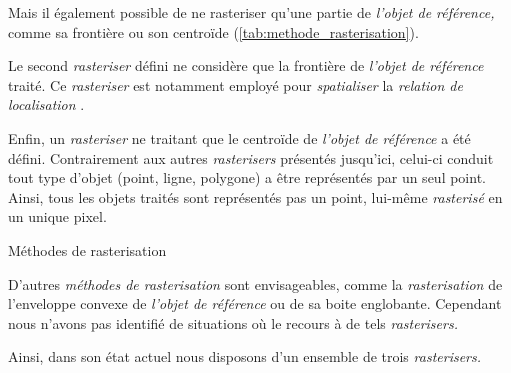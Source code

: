 Mais il également possible de ne rasteriser qu'une partie de \emph{l'objet de référence,} comme sa frontière ou son centroïde (\autoref{tab:methode_rasterisation}).

Le second \emph{rasteriser} défini ne considère que la frontière de \emph{l'objet de référence} traité.
%
Ce \emph{rasteriser} est notamment employé pour \emph{spatialiser} la \emph{relation de localisation} .

Enfin, un \emph{rasteriser} ne traitant que le centroïde de \emph{l'objet de  référence} a été défini. Contrairement aux autres \emph{rasterisers} présentés jusqu'ici, celui-ci conduit tout type d'objet (\ie point, ligne, polygone) a être représentés par un seul point. Ainsi, tous les objets traités sont représentés pas un point, lui-même \emph{rasterisé} en un unique pixel.

\begin{table}
  \centering
  
  \caption{Méthodes de rasterisation}
  \label{tab:methode_rasterisation}
\end{table}

D'autres \emph{méthodes de rasterisation} sont envisageables, comme la \emph{rasterisation} de l'enveloppe convexe de \emph{l'objet de référence} ou de sa boite englobante. Cependant nous n'avons pas identifié de situations où le recours à de tels \emph{rasterisers.}

Ainsi, dans son état actuel nous disposons d'un ensemble de trois \emph{rasterisers.}


